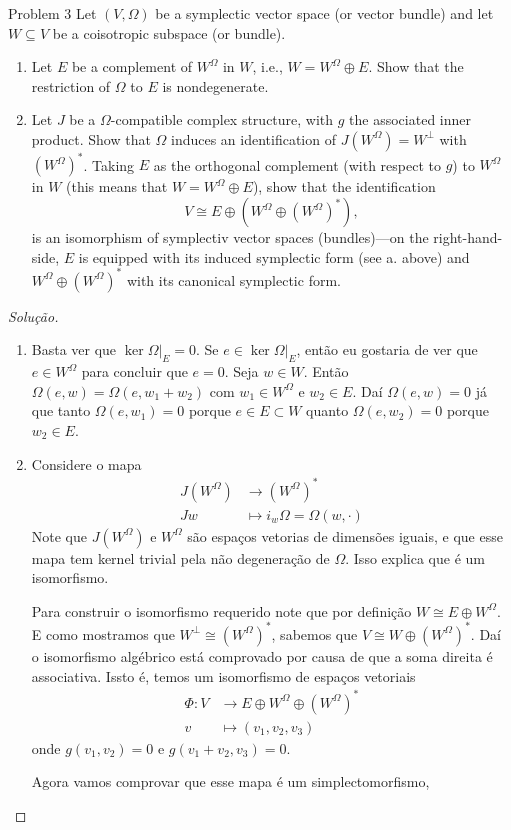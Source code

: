 \begin{thing5}{Problem 3}\leavevmode
Let $(V,\Omega)$ be a symplectic vector space (or vector bundle) and let $W\subseteq V$ be a coisotropic subspace (or bundle).
\begin{enumerate}[label=\alph*.]
	\item Let $E$ be a complement of $W^\Omega$ in $W$, i.e., $W=W^\Omega\oplus E$. Show that the restriction of $\Omega$ to $E$ is nondegenerate.
	\item Let $J$ be a $\Omega$-compatible complex structure, with $g$ the associated inner product. Show that $\Omega$ induces an identification of $J(W^\Omega)=W^\perp$ with $(W^\Omega)^*$. Taking $E$ as the orthogonal complement (with respect to $g$) to $W^\Omega$ in $W$ (this means that $W=W^\Omega\oplus E$), show that the identification
		\[V\cong E\oplus (W^\Omega\oplus (W^\Omega)^*),\]
		is an isomorphism of symplectiv vector spaces (bundles)---on the right-hand-side, $E$ is equipped with its induced symplectic form (see a. above) and $W^\Omega\oplus (W^\Omega)^*$  with its canonical symplectic form.
\end{enumerate}
\end{thing5}

\begin{proof}[Solução]\leavevmode 
\begin{enumerate}[label=\alph*.]
	\item 	Basta ver que $\ker \Omega|_{E}=0$. Se $e\in\ker \Omega|_{E}$, então eu gostaria de ver que $e\in W^\Omega$ para concluir que $e=0$. Seja $w\in W$. Então $\Omega(e,w)=\Omega(e,w_1+w_2)$ com $w_1\in W^\Omega$ e $w_2\in E$. Daí $\Omega(e,w)=0$ já que tanto $\Omega(e,w_1)=0$ porque $e\in E\subset W$ quanto $\Omega(e,w_2)=0$ porque $w_2\in E$.

	\item Considere o mapa
		\begin{align*}
			J(W^\Omega) &\longrightarrow (W^\Omega)^* \\
			Jw &\longmapsto i_w\Omega= \Omega(w,\cdot )
		\end{align*}
		Note que $J(W^\Omega)$ e $W^\Omega$ são espaços vetorias de dimensões iguais, e que esse mapa tem kernel trivial pela não degeneração de $\Omega$. Isso explica que é um isomorfismo.

	Para construir o isomorfismo requerido note que por definição $W\cong E\oplus W^\Omega$. E como mostramos que $W^\perp\cong (W^\Omega)^*$, sabemos que $V\cong W\oplus (W^\Omega)^*$. Daí o isomorfismo algébrico está comprovado por causa de que a soma direita é associativa. Issto é, temos um isomorfismo de espaços vetoriais
	\begin{align*}
		\Phi: V &\longrightarrow E\oplus W^\Omega\oplus (W^\Omega)^* \\
		v &\longmapsto (v_1,v_2,v_3)
	\end{align*}
	onde $g(v_1,v_2)=0$ e $g(v_1+v_2,v_3)=0$.

	Agora vamos comprovar que esse mapa é um simplectomorfismo, 
	
\end{enumerate}
\end{proof}

